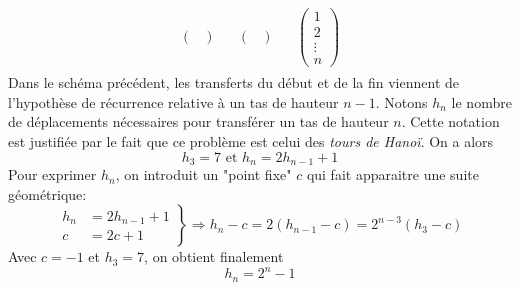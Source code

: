 \begin{enumerate}
\begin{multline*}
\begin{aligned}
\begin{pmatrix}
 \\  
\end{pmatrix}
& &
\begin{pmatrix}
 \\
\end{pmatrix}
& &
\begin{pmatrix}
1 \\ 2 \\ \vdots \\ n
\end{pmatrix}
\end{aligned}  
\end{multline*}
Dans le schéma précédent, les transferts du début et de la fin viennent de l'hypothèse de récurrence relative à un tas de hauteur $n-1$.\newline
Notons $h_n$ le nombre de déplacements nécessaires pour transférer un tas de hauteur $n$. Cette notation est justifiée par le fait que ce problème est celui des \emph{tours de Hanoï}. On a alors
\begin{displaymath}
  h_3 = 7 \text{ et } h_n=2h_{n-1}+1
\end{displaymath}
Pour exprimer $h_n$, on introduit un "point fixe" $c$ qui fait apparaitre une suite géométrique:
\begin{displaymath}
  \left. 
  \begin{aligned}
    h_n &=2h_{n-1}+1 \\ c &= 2c+1
  \end{aligned}
\right\rbrace 
\Rightarrow
h_n - c = 2(h_{n-1}-c) = 2 ^{n-3}(h_3-c)
\end{displaymath}
Avec $c=-1$ et $h_3=7$, on obtient finalement
\begin{displaymath}
  h_n = 2^n -1
\end{displaymath}

\end{enumerate}
